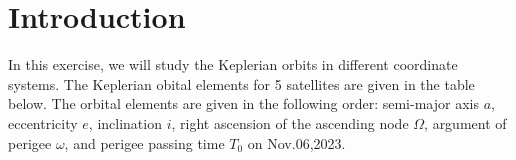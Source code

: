 \documentclass[12pt
,headinclude
,headsepline
,bibtotocnumbered
]{scrartcl}
\begin{document}
\section{Introduction}
In this exercise, we will study the Keplerian orbits in different coordinate systems. The Keplerian obital elements for 5 satellites are given in the table below. The orbital elements are given in the following order: semi-major axis $a$, eccentricity $e$, inclination $i$, right ascension of the ascending node $\Omega$, argument of perigee $\omega$, and perigee passing time $T_0$ on Nov.06,2023.
\begin{table}[H]
\centering
\renewcommand\arraystretch{1.5}
\end{table}
\end{document}
